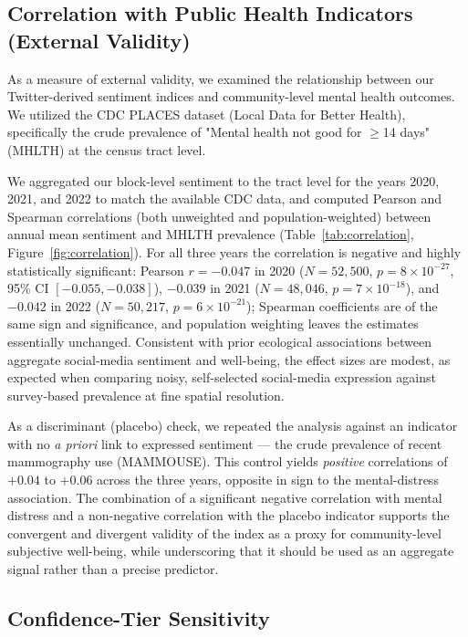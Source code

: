 \documentclass[fleqn,10pt]{wlscirep}
\begin{document}
\subsection*{Correlation with Public Health Indicators (External Validity)}

As a measure of external validity, we examined the relationship between our Twitter-derived sentiment indices and community-level mental health outcomes. We utilized the CDC PLACES dataset (Local Data for Better Health), specifically the crude prevalence of "Mental health not good for $\ge$14 days" (MHLTH) at the census tract level.

We aggregated our block-level sentiment to the tract level for the years 2020, 2021, and 2022 to match the available CDC data, and computed Pearson and Spearman correlations (both unweighted and population-weighted) between annual mean sentiment and MHLTH prevalence (Table~\ref{tab:correlation}, Figure~\ref{fig:correlation}). For all three years the correlation is negative and highly statistically significant: Pearson $r = -0.047$ in 2020 ($N = 52{,}500$, $p = 8\times10^{-27}$, 95\% CI $[-0.055, -0.038]$), $-0.039$ in 2021 ($N = 48{,}046$, $p = 7\times10^{-18}$), and $-0.042$ in 2022 ($N = 50{,}217$, $p = 6\times10^{-21}$); Spearman coefficients are of the same sign and significance, and population weighting leaves the estimates essentially unchanged. Consistent with prior ecological associations between aggregate social-media sentiment and well-being, the effect sizes are modest, as expected when comparing noisy, self-selected social-media expression against survey-based prevalence at fine spatial resolution.

As a discriminant (placebo) check, we repeated the analysis against an indicator with no \textit{a priori} link to expressed sentiment --- the crude prevalence of recent mammography use (MAMMOUSE). This control yields \textit{positive} correlations of $+0.04$ to $+0.06$ across the three years, opposite in sign to the mental-distress association. The combination of a significant negative correlation with mental distress and a non-negative correlation with the placebo indicator supports the convergent and divergent validity of the index as a proxy for community-level subjective well-being, while underscoring that it should be used as an aggregate signal rather than a precise predictor.

\subsection*{Confidence-Tier Sensitivity}
\end{document}
